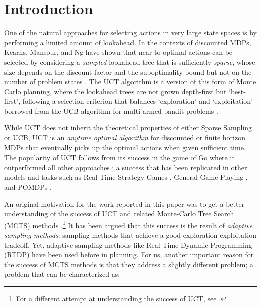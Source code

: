 \documentclass[letterpaper]{article}
\begin{document}
\section{Introduction}

One of the natural approaches for selecting  actions in  very large state spaces
is by performing a limited amount of lookahead. In the contexts of discounted
MDPs, Kearns, Mansour, and Ng have shown  that near to optimal actions can be selected by considering a 
\emph{sampled}  lookahead tree that is sufficiently \emph{sparse},   whose size depends on the discount factor
and the suboptimality bound  but not on  the number of problem states \cite{kearns:sparse99}. 
The UCT algorithm \cite{uct} is a version of this form of Monte Carlo planning, where the lookahead trees are not grown
depth-first but `best-first',  following a selection criterion that balances `exploration' and `exploitation'
borrowed from the UCB algorithm  for  multi-armed bandit problems \cite{ucb}.

While UCT does not inherit the theoretical properties of either Sparse Sampling or UCB,
UCT is an \emph{anytime optimal algorithm} for discounted or finite horizon MDPs that
eventually picks up the optimal actions when given sufficient time. The popularity of 
UCT follows from its success in the game of Go where it outperformed all other approaches \cite{uct:go}; a success that
has been replicated in other models and tasks such as   Real-Time Strategy Games \cite{fern:uct}, 
General Game Playing \cite{uct:ggp}, and POMDPs \cite{silver:pomdps}.

An original  motivation for the work reported in this paper was to get a better understanding
of  the success of UCT and related Monte-Carlo Tree Search (MCTS) methods \cite{mcts}.\footnote{
For a different attempt at understanding the success of UCT, see \cite{selman:uct}.}
It has been argued that this  success is the result of \emph{adaptive sampling methods}: sampling methods that achieve a good 
exploration-exploitation tradeoff. Yet, adaptive sampling methods like  Real-Time Dynamic Programming  (RTDP)  \cite{barto:rtdp}
have been used before in planning. For us,  another important reason  for the success of MCTS  methods is that
they address a slightly different problem; a problem that can be characterized as:
\end{document}
